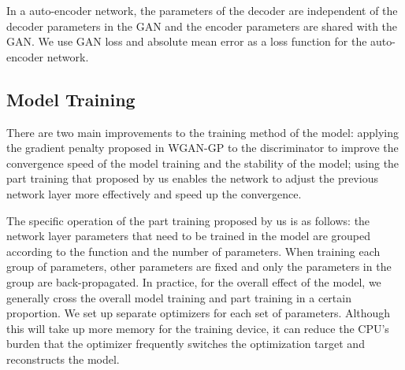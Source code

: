 In a auto-encoder network, the parameters of the decoder are independent of the decoder parameters in the GAN and the encoder parameters are shared with the GAN.
We use GAN loss and absolute mean error as a loss function for the auto-encoder network.

\subsection{Model Training}
There are two main improvements to the training method of the model:
    applying the gradient penalty proposed in WGAN-GP to the discriminator to improve the convergence speed of the model training and the stability of the model;
    using the part training that proposed by us enables the network to adjust the previous network layer more effectively and speed up the convergence.

The specific operation of the part training proposed by us is as follows: the network layer parameters that need to be trained in the model are grouped according to the function and the number of parameters.
When training each group of parameters, other parameters are fixed and only the parameters in the group are back-propagated.
In practice, for the overall effect of the model, we generally cross the overall model training and part training in a certain proportion.
We set up separate optimizers for each set of parameters.
Although this will take up more memory for the training device, it can reduce the CPU's burden that the optimizer frequently switches the optimization target and reconstructs the model.